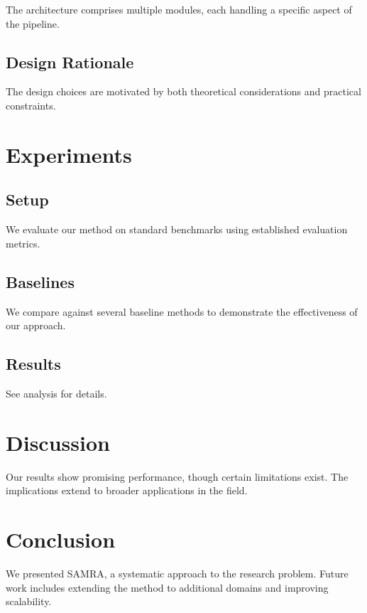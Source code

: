 \documentclass[11pt,a4paper]{article}
\begin{document}
The architecture comprises multiple modules, each handling a specific aspect of the pipeline.

\subsection{Design Rationale}

The design choices are motivated by both theoretical considerations and practical constraints.

\section{Experiments}

\subsection{Setup}

We evaluate our method on standard benchmarks using established evaluation metrics.

\subsection{Baselines}

We compare against several baseline methods to demonstrate the effectiveness of our approach.

\subsection{Results}

See analysis for details.

\section{Discussion}

Our results show promising performance, though certain limitations exist. The implications extend to broader applications in the field.

\section{Conclusion}

We presented SAMRA, a systematic approach to the research problem. Future work includes extending the method to additional domains and improving scalability.
\end{document}
